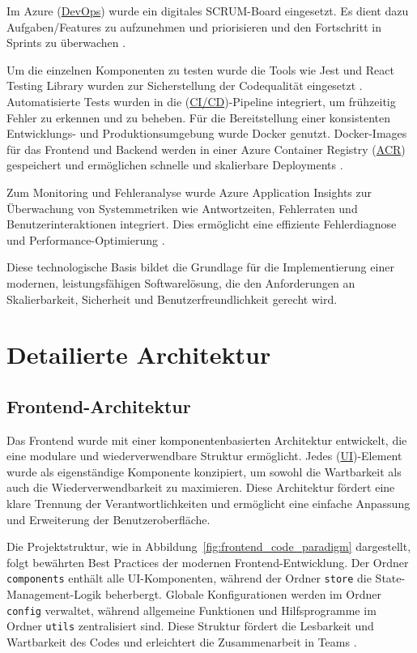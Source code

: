 Im Azure (\hyperref[abkuerzungen]{DevOps}) wurde ein digitales SCRUM-Board  eingesetzt. Es dient dazu Aufgaben/Features zu aufzunehmen und priorisieren und den Fortschritt in Sprints zu überwachen \cite{scrumGuide}.

Um die einzelnen Komponenten zu testen wurde die Tools wie Jest und React Testing Library wurden zur Sicherstellung der Codequalität eingesetzt \cite{jestDocumentation}. 
Automatisierte Tests wurden in die (\hyperref[abkuerzungen]{CI/CD})-Pipeline integriert, um frühzeitig Fehler zu erkennen und zu beheben.
Für die Bereitstellung einer konsistenten Entwicklungs- und Produktionsumgebung wurde Docker genutzt. Docker-Images für das Frontend und Backend werden in einer Azure Container Registry (\hyperref[abkuerzungen]{ACR}) gespeichert und ermöglichen schnelle und skalierbare Deployments \cite{dockerScalability}.

Zum Monitoring und Fehleranalyse wurde Azure Application Insights zur Überwachung von Systemmetriken wie Antwortzeiten, Fehlerraten und Benutzerinteraktionen integriert. Dies ermöglicht eine effiziente Fehlerdiagnose und Performance-Optimierung \cite{microsoftAppInsights}.


Diese technologische Basis bildet die Grundlage für die Implementierung einer modernen, leistungsfähigen Softwarelösung, die den Anforderungen an Skalierbarkeit, Sicherheit und Benutzerfreundlichkeit gerecht wird.


\section{Detailierte Architektur}
\subsection{Frontend-Architektur}
Das Frontend wurde mit einer komponentenbasierten Architektur entwickelt, die eine modulare und wiederverwendbare Struktur ermöglicht. Jedes (\hyperref[abkuerzungen]{UI})-Element wurde als eigenständige Komponente konzipiert, um sowohl die Wartbarkeit als auch die Wiederverwendbarkeit zu maximieren. Diese Architektur fördert eine klare Trennung der Verantwortlichkeiten und ermöglicht eine einfache Anpassung und Erweiterung der Benutzeroberfläche.

Die Projektstruktur, wie in Abbildung~\ref{fig:frontend_code_paradigm} dargestellt, folgt bewährten Best Practices der modernen Frontend-Entwicklung. Der Ordner \texttt{components} enthält alle UI-Komponenten, während der Ordner \texttt{store} die State-Management-Logik beherbergt. Globale Konfigurationen werden im Ordner \texttt{config} verwaltet, während allgemeine Funktionen und Hilfsprogramme im Ordner \texttt{utils} zentralisiert sind. Diese Struktur fördert die Lesbarkeit und Wartbarkeit des Codes und erleichtert die Zusammenarbeit in Teams \cite{reactDocumentation}.

